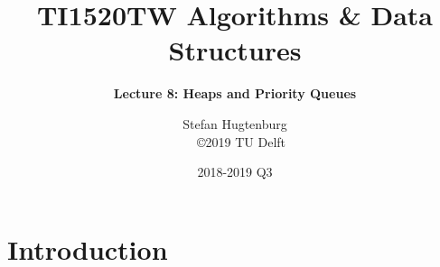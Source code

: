 

\title[Algorithms \& Data Structures]{TI1520TW Algorithms \& Data Structures}
\subtitle{\color{cyan} \textbf{Lecture 8: Heaps and Priority Queues}}
\author{Stefan Hugtenburg\\ {\tiny{\qquad~~\copyright 2019 TU Delft}}}
\date{2018-2019 Q3}



\frame{\titlepage}

\section{Introduction}














\frame{\titlepage}


